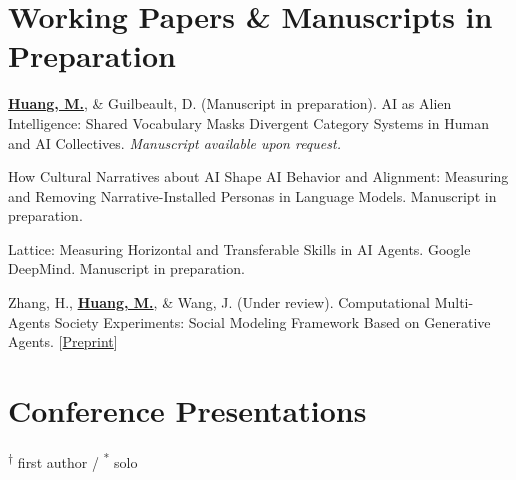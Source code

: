 \documentclass[11pt,letterpaper]{article}
\newcommand{\myname}[1]{\textbf{\uline{#1}}}
\begin{document}
\section*{Working Papers \& Manuscripts in Preparation}

\begin{enumerate}[label={[\arabic*]}]
    \item \myname{Huang, M.}, \& Guilbeault, D. (Manuscript in preparation). AI as Alien Intelligence: Shared Vocabulary Masks Divergent Category Systems in Human and AI Collectives. \textit{Manuscript available upon request.}
    \item How Cultural Narratives about AI Shape AI Behavior and Alignment: Measuring and Removing Narrative-Installed Personas in Language Models. Manuscript in preparation.
    \item Lattice: Measuring Horizontal and Transferable Skills in AI Agents. Google DeepMind. Manuscript in preparation.
    \item Zhang, H., \myname{Huang, M.}, \& Wang, J. (Under review). Computational Multi-Agents Society Experiments: Social Modeling Framework Based on Generative Agents. [\href{https://arxiv.org/abs/2508.17366}{Preprint}]
\end{enumerate}

\section*{Conference Presentations}

\noindent\textsuperscript{$\dagger$} first author / \textsuperscript{*} solo
\end{document}
